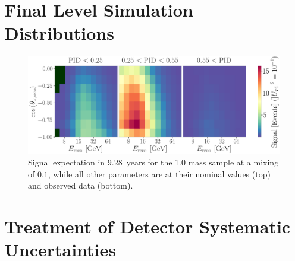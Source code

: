 \section{Final Level Simulation Distributions} 

\begin{figure}[h]
    \includegraphics{figures/results/3d_histograms/signal_1.0_GeV_combined_U_tau4_sq_0.1000_total.png}
    \caption[Three dimensional signal expectation]{Signal expectation in \SI{9.28}{years} for the \SI{1.0}{\gev} mass sample at a mixing of $0.1$, while all other parameters are at their nominal values (top) and observed data (bottom).}
\end{figure}


\section{Treatment of Detector Systematic Uncertainties} 


